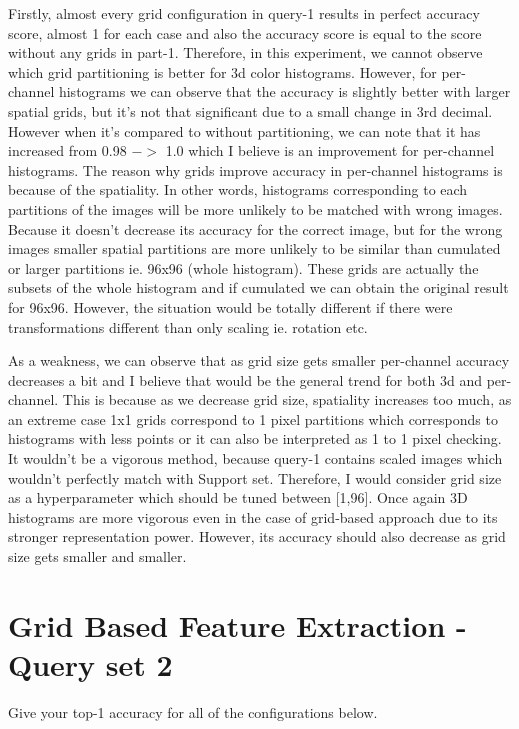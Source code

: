 \documentclass[12pt]{article}
\begin{document}
Firstly, almost every grid configuration in query-1 results in perfect accuracy score, almost 1 for each case
and also the accuracy score is equal to the score without any grids in part-1.
Therefore, in this experiment, we cannot observe which grid partitioning is better for 3d color histograms.
However, for per-channel histograms we can observe that the accuracy is slightly better with 
larger spatial grids, but it's not that significant due to a small change in 3rd decimal.
However when it's compared to without partitioning, we can note that it has increased
from 0.98 $->$ 1.0 which I believe is an improvement for per-channel histograms.
The reason why grids improve accuracy in per-channel histograms is because of the spatiality.
In other words, histograms corresponding to each partitions of the images 
will be more unlikely to be matched with wrong images. Because it doesn't decrease its
accuracy for the correct image, but for the wrong images smaller spatial partitions are more unlikely to be similar
than cumulated or larger partitions ie. 96x96 (whole histogram). These grids are actually the subsets of the whole histogram 
and if cumulated we can obtain the original result for 96x96.
However, the situation would be totally different if there were transformations different than only scaling ie. rotation etc. 


As a weakness, we can observe that as grid size gets smaller per-channel accuracy decreases a bit 
and I believe that would be the general trend for both 3d and per-channel.
This is because as we decrease grid size, spatiality increases too much,
as an extreme case 1x1 grids correspond to 1 pixel partitions which corresponds to
histograms with less points or it can also be interpreted as 1 to 1 pixel checking.
It wouldn't be a vigorous method, because query-1 contains scaled images which wouldn't 
perfectly match with Support set. Therefore, I would consider grid size as a hyperparameter
which should be tuned between [1,96]. Once again 3D histograms are more vigorous even in the case of
grid-based approach due to its stronger representation power. However, its accuracy should also decrease as
grid size gets smaller and smaller.

\section{Grid Based Feature Extraction - Query set 2}
Give your top-1 accuracy for all of the configurations below.
\end{document}

